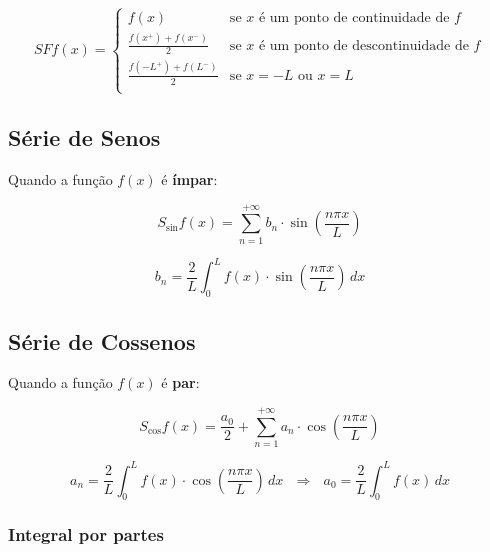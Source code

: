 \documentclass[11pt, a4paper]{article}
\begin{document}
\begin{equation*}
    SFf(x) =
    \begin{cases}
        f(x)                     & \text{se $x$ é um ponto de continuidade de $f$}    \\
        \frac{f(x^+)+f(x^-)}{2}  & \text{se $x$ é um ponto de descontinuidade de $f$} \\
        \frac{f(-L^+)+f(L^-)}{2} & \text{se $x = -L$ ou $x = L$}                      \\
    \end{cases}
\end{equation*}

\subsection{Série de Senos}

Quando a função $f(x)$ é \textbf{ímpar}:

\begin{equation*}
    S_{\sin} f(x) =
    \sum_{n=1}^{+\infty}b_n \cdot \sin\left(\frac{n\pi x}{L}\right)
\end{equation*}

\begin{equation*}
    b_n =
    \frac{2}{L} \int_{0}^{L} f(x) \cdot \sin\left(\frac{n\pi x}{L}\right) \, dx
\end{equation*}

\subsection{Série de Cossenos}

Quando a função $f(x)$ é \textbf{par}:

\begin{equation*}
    S_{\cos} f(x) = \frac{a_0}{2} + \sum_{n=1}^{+\infty}
    a_n \cdot \cos\left(\frac{n\pi x}{L}\right)
\end{equation*}

\begin{equation*}
    a_n =
    \frac{2}{L} \int_{0}^{L} f(x) \cdot \cos\left(\frac{n\pi x}{L}\right) \, dx
    \ \ \ \Rightarrow \ \ \
    a_0 =
    \frac{2}{L} \int_{0}^{L} f(x) \, dx
\end{equation*}

\subsubsection*{Integral por partes}
\end{document}
